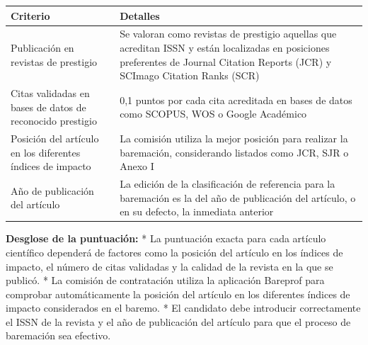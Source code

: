 \documentclass{article}
\begin{document}
\begin{itemize}
\begin{itemize}
                        \vspace{0.4cm}
                        \begin{table}[h!]\centering\renewcommand{\arraystretch}{1.3}
                              \begin{tabular}{|p{}|p{}|}\hline
                                    Criterio                                                   & Detalles                                                                                                                                                                         \\\hline
                                    Publicación en revistas de prestigio                       & Se valoran como revistas de prestigio aquellas que acreditan ISSN y están localizadas en posiciones preferentes de Journal Citation Reports (JCR) y SCImago Citation Ranks (SCR) \\\hline
                                    Citas validadas en bases de datos de reconocido prestigio  & 0,1 puntos por cada cita acreditada en bases de datos como SCOPUS, WOS o Google Académico                                                                                        \\\hline
                                    Posición del artículo en los diferentes índices de impacto & La comisión utiliza la mejor posición para realizar la baremación, considerando listados como JCR, SJR o Anexo I                                                                 \\\hline
                                    Año de publicación del artículo                            & La edición de la clasificación de referencia para la baremación es la del año de publicación del artículo, o en su defecto, la inmediata anterior                                \\\hline
                              \end{tabular}\end{table}
                        \vspace{0.4cm}

                        \textbf{Desglose de la puntuación:}
                        * La puntuación exacta para cada artículo científico dependerá de factores como la posición del artículo en los índices de impacto, el número de citas validadas y la calidad de la revista en la que se publicó.
                        * La comisión de contratación utiliza la aplicación Bareprof para comprobar automáticamente la posición del artículo en los diferentes índices de impacto considerados en el baremo.
                        * El candidato debe introducir correctamente el ISSN de la revista y el año de publicación del artículo para que el proceso de baremación sea efectivo.


\end{itemize}
\end{itemize}
\end{document}
